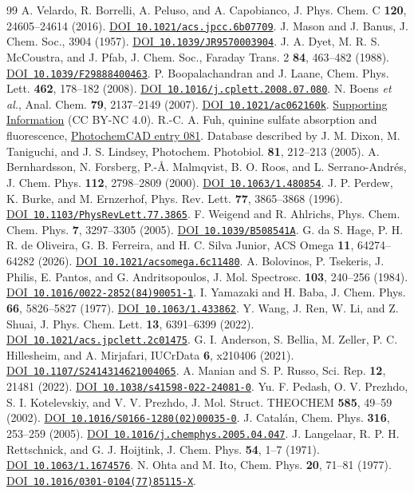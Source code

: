 \documentclass[11pt]{article}
\newcommand{\doi}[1]{\href{https://doi.org/#1}{DOI~\nolinkurl{#1}}}
\begin{document}
\begin{thebibliography}{99}
 A. Velardo, R. Borrelli, A. Peluso, and A. Capobianco, J. Phys. Chem. C \textbf{120}, 24605--24614 (2016). \doi{10.1021/acs.jpcc.6b07709}.
 J. Mason and J. Banus, J. Chem. Soc., 3904 (1957). \doi{10.1039/JR9570003904}.
 J. A. Dyet, M. R. S. McCoustra, and J. Pfab, J. Chem. Soc., Faraday Trans. 2 \textbf{84}, 463--482 (1988). \doi{10.1039/F29888400463}.
 P. Boopalachandran and J. Laane, Chem. Phys. Lett. \textbf{462}, 178--182 (2008). \doi{10.1016/j.cplett.2008.07.080}.
 N. Boens \emph{et al.}, Anal. Chem. \textbf{79}, 2137--2149 (2007). \doi{10.1021/ac062160k}. \href{https://doi.org/10.1021/ac062160k.s001}{Supporting Information} (CC BY-NC 4.0).
 R.-C. A. Fuh, quinine sulfate absorption and fluorescence, \href{https://omlc.org/spectra/PhotochemCAD/html/081.html}{PhotochemCAD entry 081}. Database described by J. M. Dixon, M. Taniguchi, and J. S. Lindsey, Photochem. Photobiol. \textbf{81}, 212--213 (2005).
 A. Bernhardsson, N. Forsberg, P.-{\AA}. Malmqvist, B. O. Roos, and L. Serrano-Andr\'es, J. Chem. Phys. \textbf{112}, 2798--2809 (2000). \doi{10.1063/1.480854}.
 J. P. Perdew, K. Burke, and M. Ernzerhof, Phys. Rev. Lett. \textbf{77}, 3865--3868 (1996). \doi{10.1103/PhysRevLett.77.3865}.
 F. Weigend and R. Ahlrichs, Phys. Chem. Chem. Phys. \textbf{7}, 3297--3305 (2005). \doi{10.1039/B508541A}.
 G. da S. Hage, P. H. R. de Oliveira, G. B. Ferreira, and H. C. Silva Junior, ACS Omega \textbf{11}, 64274--64282 (2026). \doi{10.1021/acsomega.6c11480}.
 A. Bolovinos, P. Tsekeris, J. Philis, E. Pantos, and G. Andritsopoulos, J. Mol. Spectrosc. \textbf{103}, 240--256 (1984). \doi{10.1016/0022-2852(84)90051-1}.
 I. Yamazaki and H. Baba, J. Chem. Phys. \textbf{66}, 5826--5827 (1977). \doi{10.1063/1.433862}.
 Y. Wang, J. Ren, W. Li, and Z. Shuai, J. Phys. Chem. Lett. \textbf{13}, 6391--6399 (2022). \doi{10.1021/acs.jpclett.2c01475}.
 G. I. Anderson, S. Bellia, M. Zeller, P. C. Hillesheim, and A. Mirjafari, IUCrData \textbf{6}, x210406 (2021). \doi{10.1107/S2414314621004065}.
 A. Manian and S. P. Russo, Sci. Rep. \textbf{12}, 21481 (2022). \doi{10.1038/s41598-022-24081-0}.
 Yu. F. Pedash, O. V. Prezhdo, S. I. Kotelevskiy, and V. V. Prezhdo, J. Mol. Struct. THEOCHEM \textbf{585}, 49--59 (2002). \doi{10.1016/S0166-1280(02)00035-0}.
 J. Catal\'an, Chem. Phys. \textbf{316}, 253--259 (2005). \doi{10.1016/j.chemphys.2005.04.047}.
 J. Langelaar, R. P. H. Rettschnick, and G. J. Hoijtink, J. Chem. Phys. \textbf{54}, 1--7 (1971). \doi{10.1063/1.1674576}.
 N. Ohta and M. Ito, Chem. Phys. \textbf{20}, 71--81 (1977). \doi{10.1016/0301-0104(77)85115-X}.

\end{thebibliography}
\endgroup
\end{document}
